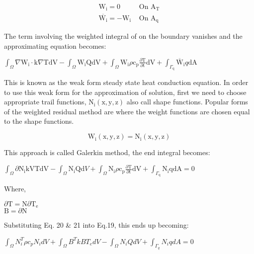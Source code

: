 \documentclass[10pt]{article}
\begin{document}
\[
\begin{array}{ll}
\mathrm{W}_{\mathrm{i}}=0 & \text { On } \mathrm{A}_{\mathrm{T}} \\
\overline{\mathrm{W}_{\mathrm{i}}}=-\mathrm{W}_{\mathrm{i}} & \text { On } \mathrm{A}_{\mathrm{q}} \tag{16}
\end{array}
\]

The term involving the weighted integral of on the boundary vanishes and the approximating equation becomes:

$\int_{\Omega} \nabla \mathrm{W}_{\mathrm{i}} \cdot \mathrm{k} \nabla \mathrm{TdV}-\int_{\Omega} \mathrm{W}_{\mathrm{i}} \mathrm{QdV}+\int_{\Omega} \mathrm{W}_{\mathrm{i}} \rho \mathrm{c}_{\mathrm{p}} \frac{\partial \mathrm{T}}{\partial \mathrm{t}} \mathrm{dV}+\int_{\Gamma_{\mathrm{q}}} \overline{\mathrm{W}}_{\mathrm{i}} q \mathrm{dA}$

This is known as the weak form steady state heat conduction equation. In order to use this weak form for the approximation of solution, first we need to choose appropriate trail functions, $\mathrm{N}_{\mathrm{i}}(\mathrm{x}, \mathrm{y}, \mathrm{z})$ also call shape functions. Popular forms of the weighted residual method are where the weight functions are chosen equal to the shape functions.


\begin{equation*}
\mathrm{W}_{\mathrm{i}}(\mathrm{x}, \mathrm{y}, \mathrm{z})=\mathrm{N}_{\mathrm{i}}(\mathrm{x}, \mathrm{y}, \mathrm{z}) \tag{18}
\end{equation*}


This approach is called Galerkin method, the end integral becomes:

$\int_{\Omega} \partial \mathrm{N}_{\mathrm{i}} \mathrm{kVTdV}-\int_{\Omega} \mathrm{N}_{\mathrm{i}} \mathrm{Q} \mathrm{d} V+\int_{\Omega} \mathrm{N}_{\mathrm{i}} \rho \mathrm{c}_{\mathrm{p}} \frac{\partial \mathrm{T}}{\partial \mathrm{t}} \mathrm{dV}+\int_{\Gamma_{\mathrm{q}}} \mathrm{N}_{\mathrm{i}} \mathrm{qdA}=0$

Where,

$\partial \mathrm{T}=\mathrm{N} \partial \mathrm{T}_{\mathrm{e}}$\\
$\mathrm{B}=\partial \mathrm{N}$

Substituting Eq. 20 \& 21 into Eq.19, this ends up becoming:

$\int_{\Omega} N_{i}^{T} \rho c_{p} N_{i} d V+\int_{\Omega} B^{T} k B T_{e} d V-\int_{\Omega} N_{i} Q d V+\int_{\Gamma_{q}} N_{i} q d A=0$
\end{document}
